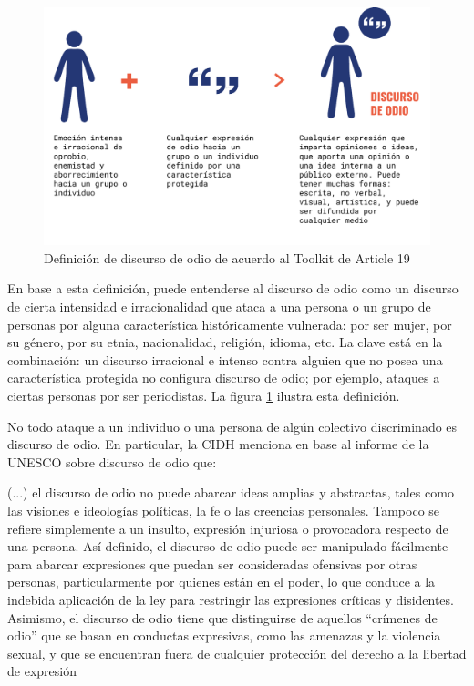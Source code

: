 
\begin{figure}[t]
    \centering
    \includegraphics[width=\textwidth]{img/discurso_de_odio.pdf}
    \caption{Definición de discurso de odio de acuerdo al Toolkit de Article 19}
    \label{fig:hate_speech_definition_article_19}
\end{figure}


En base a esta definición, puede entenderse al discurso de odio como un discurso de cierta intensidad e irracionalidad que ataca a una persona o un grupo de personas por alguna característica históricamente vulnerada: por ser mujer, por su género, por su etnia, nacionalidad, religión, idioma, etc. La clave está en la combinación: un discurso irracional e intenso contra alguien que no posea una característica protegida no configura discurso de odio; por ejemplo, ataques a ciertas personas por ser periodistas. La figura \ref{fig:hate_speech_definition_article_19} ilustra esta definición.

No todo ataque a un individuo o una persona de algún colectivo discriminado es discurso de odio. En particular, la CIDH \cite{CIDH2015} menciona en base al informe de la UNESCO sobre discurso de odio \cite{gagliardone2015countering} que:

\begin{displayquote}[]
    (...) el discurso de odio no puede abarcar ideas amplias y abstractas, tales como las visiones e ideologías políticas, la fe o las creencias personales. Tampoco se refiere simplemente a un insulto, expresión injuriosa o provocadora respecto de una persona. Así definido, el discurso de odio puede ser manipulado fácilmente para abarcar expresiones que puedan ser consideradas ofensivas por otras personas, particularmente por quienes están en el poder, lo que conduce a la indebida aplicación de la ley para restringir las expresiones críticas y disidentes. Asimismo, el discurso de odio tiene que distinguirse de aquellos “crímenes de odio” que se basan en conductas expresivas, como las amenazas y la violencia sexual, y que se encuentran fuera de cualquier protección del derecho a la libertad de expresión
\end{displayquote}

